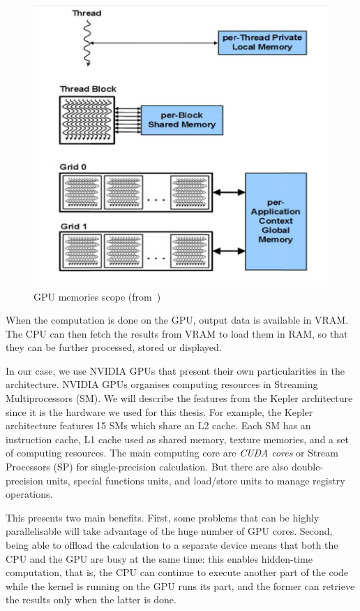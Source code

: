 \begin{figure}[h]
	\centering
	\includegraphics[width=0.6\linewidth]{gpu-memory-scope}
	\caption{GPU memories scope (from~\cite{nvidia:keplerarch})}
	\label{fig:gpu-memory-scope}
\end{figure}

When the computation is done on the GPU, output data is available in VRAM. The CPU can then fetch the results from VRAM to load them in RAM, so that they can be further processed, stored or displayed.

In our case, we use NVIDIA GPUs that present their own particularities in the architecture. NVIDIA GPUs organises computing resources in Streaming Multiprocessors (SM). We will describe the features from the Kepler architecture since it is the hardware we used for this thesis. For example, the Kepler architecture features 15 SMs which share an L2 cache. Each SM has an instruction cache, L1 cache used as shared memory, texture memories, and a set of computing resources. The main computing core are \emph{CUDA cores} or Stream Processors (SP) for single-precision calculation. But there are also double-precision units, special functions units, and load/store units to manage registry operations. 


This presents two main benefits. First, some problems that can be highly parallelisable will take advantage of the huge number of GPU cores. Second, being able to offload the calculation to a separate device means that both the CPU and the GPU are busy at the same time: this enables hidden-time computation, that is, the CPU can continue to execute another part of the code while the kernel is running on the GPU runs its part, and the former can retrieve the results only when the latter is done.

